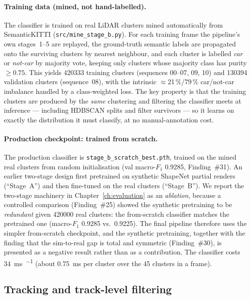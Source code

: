 \paragraph{Training data (mined, not hand-labelled).} The classifier is trained
on real LiDAR clusters mined automatically from SemanticKITTI
(\texttt{src/mine\_stage\_b.py}). For each training frame the pipeline's own
stages~1--5 are replayed, the ground-truth semantic labels are propagated onto the
surviving clusters by nearest neighbour, and each cluster is labelled \emph{car}
or \emph{not-car} by majority vote, keeping only clusters whose majority class
has purity $\geq \num{0.75}$. This yields \num{420333} training clusters
(sequences 00--07, 09, 10) and \num{130394} validation clusters (sequence~08),
with the intrinsic $\approx$21\,\%/79\,\% car/not-car imbalance handled by a
class-weighted loss. The key property is that the training clusters are produced
by the \emph{same} clustering and filtering the classifier meets at inference ---
including HDBSCAN splits and filter survivors --- so it learns on exactly the
distribution it must classify, at no manual-annotation cost.

\paragraph{Production checkpoint: trained from scratch.} The production classifier
is \texttt{stage\_b\_\allowbreak scratch\_\allowbreak best.pth}, trained on the
mined real clusters from
random initialisation (val macro-$F_1$ \num{0.9285}, Finding~\#31). An earlier
two-stage design first pretrained on synthetic ShapeNet partial renders
(``Stage~A'') and then fine-tuned on the real clusters (``Stage~B''). We report
the two-stage machinery in Chapter~\ref{ch:evaluation} as an \emph{ablation}, because a controlled
comparison (Finding~\#25) showed the synthetic pretraining to be \emph{redundant}
given \num{420000} real clusters: the from-scratch classifier matches the
pretrained one (macro-$F_1$ \num{0.9285} vs.\ \num{0.9225}). The final pipeline
therefore uses the simpler from-scratch checkpoint, and the synthetic
pretraining, together with the finding that the sim-to-real gap is total and
symmetric (Finding~\#30), is presented as a negative result rather than as a
contribution. The classifier costs \SI{34}{\milli\second\per\frame} (about
\SI{0.75}{\milli\second} per cluster over the \num{45} clusters in a frame).

\subsection{Tracking and track-level filtering}
\label{sec:pipeline-tracker}

